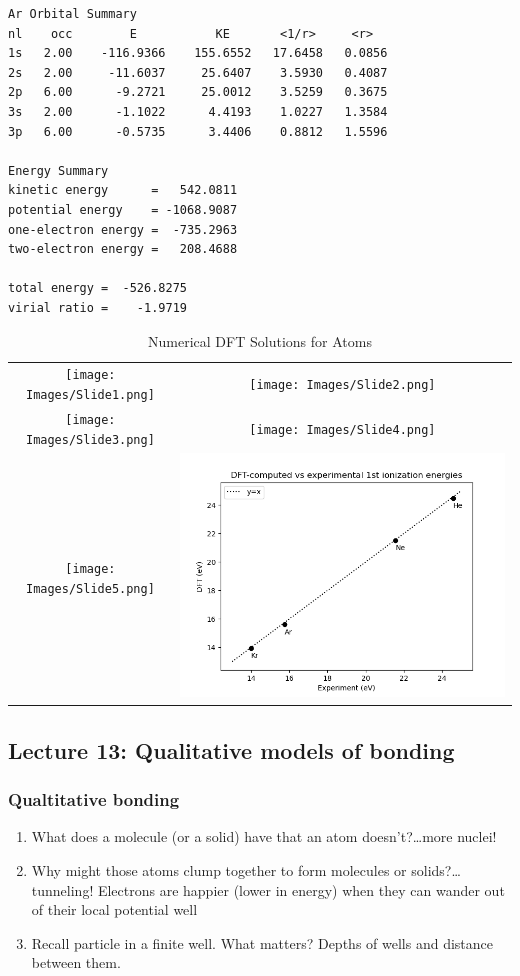 \documentclass[11pt]{article}
\begin{document}
\label{}
\begin{verbatim}
Ar Orbital Summary
nl    occ        E           KE       <1/r>     <r>
1s   2.00    -116.9366    155.6552   17.6458   0.0856
2s   2.00     -11.6037     25.6407    3.5930   0.4087
2p   6.00      -9.2721     25.0012    3.5259   0.3675
3s   2.00      -1.1022      4.4193    1.0227   1.3584
3p   6.00      -0.5735      3.4406    0.8812   1.5596

Energy Summary
kinetic energy      =   542.0811
potential energy    = -1068.9087
one-electron energy =  -735.2963
two-electron energy =   208.4688

total energy =  -526.8275
virial ratio =    -1.9719
\end{verbatim}


\begin{table}[]
   \caption{Numerical DFT Solutions for Atoms }
\begin{tabular}{cc}
\texttt{[image: Images/Slide1.png]} & \texttt{[image: Images/Slide2.png]} \\
\texttt{[image: Images/Slide3.png]} & \texttt{[image: Images/Slide4.png]} \\
\texttt{[image: Images/Slide5.png]} & \includegraphics[scale=0.5]{Images/Ionization.png} 
\end{tabular}
\end{table}
\subsection{Lecture 13: Qualitative models of bonding}
\label{sec:org1bec982}
\subsubsection{Qualtitative bonding}
\label{sec:orgb39ec79}
\begin{enumerate}
\item What does a molecule (or a solid) have that an atom doesn't?\ldots{}more nuclei!
\item Why might those atoms clump together to form molecules or solids?\ldots{}tunneling! Electrons are happier (lower in energy) when they can wander out of their local potential well
\item Recall particle in a finite well. What matters?  Depths of wells and distance between them.
\end{enumerate}
\end{document}
